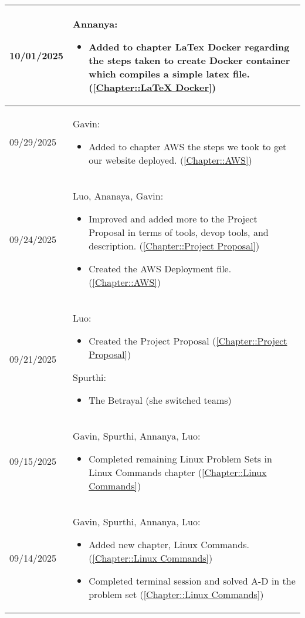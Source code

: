 \begin{longtable}{|l||p{13.5cm}|}
10/01/2025 & Annanya:
\begin{itemize}[topsep=0pt,itemsep=0pt,parsep=0pt,partopsep=0pt,leftmargin=12pt]
\item Added to chapter LaTex Docker regarding the steps taken to create Docker container which compiles a simple latex file. (\ref{Chapter::LaTeX Docker})
\end{itemize} 
\\ \hline

09/29/2025 & Gavin:
\begin{itemize}[topsep=0pt,itemsep=0pt,parsep=0pt,partopsep=0pt,leftmargin=12pt]
\item Added to chapter AWS the steps we took to get our website deployed. (\ref{Chapter::AWS})
\end{itemize} 
\\ \hline

09/24/2025 & Luo, Ananaya, Gavin:
\begin{itemize}[topsep=0pt,itemsep=0pt,parsep=0pt,partopsep=0pt,leftmargin=12pt]
\item Improved and added more to the Project Proposal in terms of tools, devop tools, and description. (\ref{Chapter::Project Proposal})
\item Created the AWS Deployment file. (\ref{Chapter::AWS})
\end{itemize} 
\\ \hline

09/21/2025 & Luo:
\begin{itemize}[topsep=0pt,itemsep=0pt,parsep=0pt,partopsep=0pt,leftmargin=12pt]
\item Created the Project Proposal (\ref{Chapter::Project Proposal})
\end{itemize} 
Spurthi:
\begin{itemize}[topsep=0pt,itemsep=0pt,parsep=0pt,partopsep=0pt,leftmargin=12pt]
\item The Betrayal (she switched teams)
\end{itemize} 
\\ \hline

09/15/2025 & Gavin, Spurthi, Annanya, Luo:
\begin{itemize}[topsep=0pt,itemsep=0pt,parsep=0pt,partopsep=0pt,leftmargin=12pt]
\item Completed remaining Linux Problem Sets in Linux Commands chapter (\ref{Chapter::Linux Commands})
\end{itemize} 
\\ \hline

09/14/2025 & Gavin, Spurthi, Annanya, Luo:
\begin{itemize}[topsep=0pt,itemsep=0pt,parsep=0pt,partopsep=0pt,leftmargin=12pt]
\item Added new chapter, Linux Commands. (\ref{Chapter::Linux Commands})
\item Completed terminal session and solved A-D in the problem set  (\ref{Chapter::Linux Commands})
\end{itemize} 
\\ \hline




\end{longtable}
